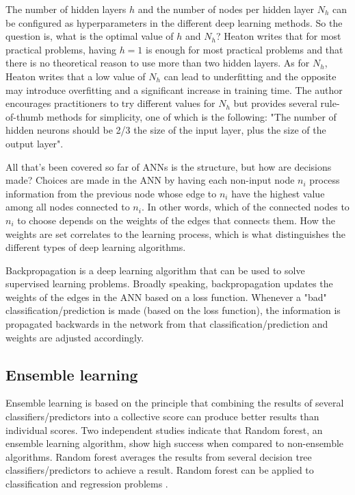 			The number of hidden layers $h$ and the number of nodes per hidden layer $N_h$ can be configured as hyperparameters in the different deep learning methods. So the question is, what is the optimal value of $h$ and $N_h$? Heaton \cite{BOOK:10} writes that for most practical problems, having $h=1$ is enough for most practical problems and that there is no theoretical reason to use more than two hidden layers. As for $N_h$, Heaton writes that a low value of $N_h$ can lead to underfitting and the opposite may introduce overfitting and a significant increase in training time. The author encourages practitioners to try different values for $N_h$ but provides several rule-of-thumb methods for simplicity, one of which is the following: "The number of hidden neurons should be 2/3 the size of the input layer, plus the size of the output layer". %

			All that's been covered so far of ANNs is the structure, but how are decisions made? Choices are made in the ANN by having each non-input node $n_i$ process information from the previous node whose edge to $n_i$ have the highest value among all nodes connected to $n_i$. In other words, which of the connected nodes to $n_i$ to choose depends on the weights of the edges that connects them. How the weights are set correlates to the learning process, which is what distinguishes the different types of deep learning algorithms.

			Backpropagation is a deep learning algorithm that can be used to solve supervised learning problems. Broadly speaking, backpropagation updates the weights of the edges in the ANN based on a loss function. Whenever a "bad" classification/prediction is made (based on the loss function), the information is propagated backwards in the network from that classification/prediction and weights are adjusted accordingly.

	\subsection{Ensemble learning}
		Ensemble learning is based on the principle that combining the results of several classifiers/predictors into a collective score can produce better results than individual scores. Two independent studies indicate that Random forest, an ensemble learning algorithm, show high success when compared to non-ensemble algorithms\cite{ARTICLE:16, IP:5}. %
		Random forest averages the results from several decision tree classifiers/predictors to achieve a result. Random forest can be applied to classification and regression problems \cite{WEBSITE:17}.

